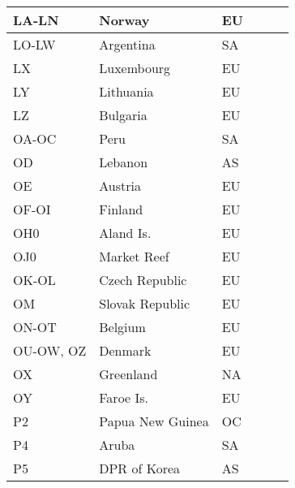\documentclass[a4paper]{article}
\begin{document}
\begin{longtable}{|p{1.5cm}|p{4cm}|l|p{2cm}|p{2cm}|p{2cm}|}
\hline
LA-LN                  & Norway                                     & EU    & & & \\
\hline
LO-LW                  & Argentina                                  & SA    & & & \\
\hline
LX                     & Luxembourg                                 & EU    & & & \\
\hline
LY                     & Lithuania                                  & EU    & & & \\
\hline
LZ                     & Bulgaria                                   & EU    & & & \\
\hline
OA-OC                  & Peru                                       & SA    & & & \\
\hline
OD                     & Lebanon                                    & AS    & & & \\
\hline
OE                     & Austria                                    & EU    & & & \\
\hline
OF-OI                  & Finland                                    & EU    & & & \\
\hline
OH0                    & Aland Is.                                  & EU    & & & \\
\hline
OJ0                    & Market Reef                                & EU    & & & \\
\hline
OK-OL                  & Czech Republic                             & EU    & & & \\
\hline
OM                     & Slovak Republic                            & EU    & & & \\
\hline
ON-OT                  & Belgium                                    & EU    & & & \\
\hline
OU-OW, OZ              & Denmark                                    & EU    & & & \\
\hline
OX                     & Greenland                                  & NA    & & & \\
\hline
OY                     & Faroe Is.                                  & EU    & & & \\
\hline
P2                     & Papua New Guinea                           & OC    & & & \\
\hline
P4                     & Aruba                                      & SA    & & & \\
\hline
P5                     & DPR of Korea                               & AS    & & & \\

\end{longtable}
\end{document}
